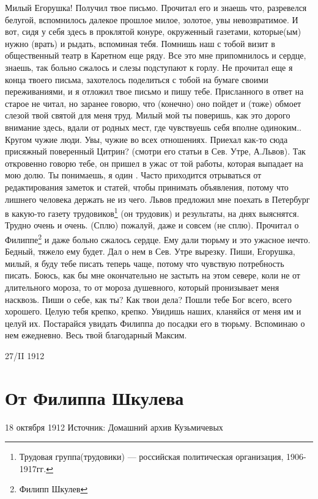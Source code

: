 \documentclass[]{memoir}
\begin{document}
Милый Егорушка!
Получил твое письмо. Прочитал его и знаешь что, разревелся белугой, вспомнилось далекое прошлое милое, золотое, увы невозвратимое. И вот, сидя у себя здесь в проклятой конуре, окруженный газетами, которые(ым) нужно (врать)  и рыдать, вспоминая тебя. Помнишь наш с тобой визит в общественный театр в Каретном еще ряду. Все это мне припомнилось и сердце, знаешь, так больно сжалось и слезы подступают к горлу. Не прочитал еще я конца твоего письма, захотелось поделиться с тобой на бумаге своими переживаниями, и я отложил твое письмо и пишу тебе.  Присланного в ответ на старое не читал, но заранее говорю, что (конечно) оно пойдет и (тоже) обмоет слезой твой святой для меня труд. Милый мой  ты поверишь, как это дорого внимание здесь, вдали от родных мест, где чувствуешь себя вполне одиноким.. Кругом чужие люди. Увы, чужие во всех отношениях. Приехал как-то сюда присяжный поверенный Цитрин? (смотри его статьи в Сев. Утре, А.Львов). Так откровенно говорю тебе, он пришел в ужас от той работы, которая  выпадает на мою долю.  Ты понимаешь, я один . Часто приходится отрываться от редактирования заметок и статей, чтобы принимать объявления, потому что лишнего человека держать не из чего. Львов предложил мне поехать в Петербург в какую-то  газету трудовиков\footnote{Трудовая группа(трудовики) — российская политическая организация, 1906-1917гг.} (он трудовик) и результаты, на днях выяснятся. Трудно очень и очень. (Сплю)  пожалуй, даже и совсем (не сплю). Прочитал о Филиппе\footnote{Филипп Шкулев} и даже больно сжалось сердце. Ему дали тюрьму и это ужасное нечто. Бедный, тяжело ему будет. Дал о нем в Сев. Утре вырезку. Пиши, Егорушка, милый, я буду тебе писать теперь чаще, потому что чувствую  потребность писать. Боюсь, как бы мне окончательно не застыть на этом севере, коли не от длительного мороза, то от мороза душевного, который пронизывает меня насквозь.
Пиши о себе, как ты? Как твои дела? Пошли тебе Бог всего, всего хорошего. Целую тебя крепко, крепко. Увидишь наших, кланяйся от меня им и целуй их. Постарайся  увидать Филиппа до посадки его  в тюрьму. Вспоминаю о нем ежедневно. Весь твой благодарный 
                                              Максим.

27/II 1912

\section{От Филиппа Шкулева}
18 октября 1912
Источник: Домашний архив Кузьмичевых
\end{document}
